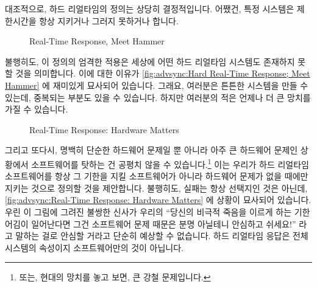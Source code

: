 대조적으로, 하드 리얼타임의 정의는 상당히 결정적입니다.
어쨌건, 특정 시스템은 제한시간을 항상 지키거나 그러지 못하거나 합니다.

\begin{figure}[bt]
\centering
{}
\caption{Real-Time Response, Meet Hammer}
\end{figure}

불행히도, 이 정의의 엄격한 적용은 세상에 어떤 하드 리얼타임 시스템도 존재하지
못할 것을 의미합니다.
이에 대한 이유가
\cref{fig:advsync:Hard Real-Time Response; Meet Hammer}
에 재미있게 묘사되어 있습니다.
그래요, 여러분은 튼튼한 시스템을 만들 수 있는데, 중복되는 부분도 있을 수
있습니다.
하지만 여러분의 적은 언제나 더 큰 망치를 가질 수 있습니다.

\begin{figure}[bt]
\centering
{}
\caption{Real-Time Response: Hardware Matters}
\end{figure}

그리고 또다시, 명백히 단순한 하드웨어 문제일 뿐 아니라 아주 큰 하드웨어 문제인
상황에서 소프트웨어를 탓하는 건 공평치 않을 수 있습니다.\footnote{
	또는, 현대의 망치를 놓고 보면, 큰 강철 문제입니다.}
이는 우리가 하드 리얼타임 소프트웨어를 항상 그 기한을 지킬 소프트웨어가 아니라
하드웨어 문제가 없을 때에만 지키는 것으로 정의할 것을 제안합니다.
불행히도, 실패는 항상 선택지인 것은 아닌데,
\cref{fig:advsync:Real-Time Response: Hardware Matters}
에 상황이 묘사되어 있습니다.
우린 이 그림에 그려진 불쌍한 신사가 우리의 ``당신의 비극적 죽음을 이르게 하는
기한 어김이 일어난다면 그건 소프트웨어 문제 때문은 분명 아닐테니 안심하고
쉬세요!'' 라고 말하는 걸로 안심할 거라고 단순히 예상할 수 없습니다.
하드 리얼타임 응답은 전체 시스템의 속성이지 소프트웨어만의 것이 아닙니다.

